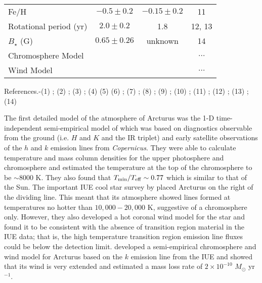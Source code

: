 \begin{table}[!hb]
\begin{center}
\begin{tabular}{lccc}
Fe/H& $-0.5\pm0.2$ & $- 0.15 \pm 0.2$ & 11\\
Rotational period (yr) & $2.0 \pm 0.2$ & 1.8 & 12, 13\\
$B_{\star}$ (G) & $0.65 \pm 0.26$ & unknown & 14\\
Chromosphere Model & \cite{drake_1985} & \cite{mcmurry_1999}& $\ldots$\\
Wind Model & \cite{drake_1985}& \cite{robinson_1998}& $\ldots$\\
\hline
\end{tabular}
\label{tab:3.4}
\begin{minipage}{14.0cm}
References.-(1) \cite{perryman_1997}; (2) \cite{van_leeuwen_2007}; (3) \cite{kallinger_2010}; (4) \cite{lebzelter_2012}  (5) \cite{ramirez_2011} (6) \cite{richichi_2005}; (7) \cite{di_benedetto_1993}; (8) \cite{massarotti_2008}; (9) \cite{drake_1985}; (10) \cite{robinson_1998};  (11) \cite{decin_2003}; (12) \cite{gray_2006}; (13) \cite{hatzes_1993}; (14) \cite{sennhauser_2011}
\end{minipage}
\end{center}
\end{table}

The first detailed model of the atmosphere of Arcturus was the 1-D time-independent semi-empirical model of \cite{ayres_1975} which was based on diagnostics observable from the ground (i.e.  $H$ and $K$ and the  IR triplet) and early satellite observations of the  $h$ and $k$ emission lines from \textit{Copernicus}. They were able to calculate temperature and mass column densities for the upper photosphere and chromosphere and estimated the temperature at the top of the chromosphere to be $\sim 8000$ K. They also found that $T_{\rm{min}}/T_{\rm{eff}} \sim 0.77$ which is similar to that of the Sun. The important IUE cool star survey by \cite{linsky_1979} placed Arcturus on the right of the dividing line. This meant that its atmosphere showed lines formed at temperatures no hotter than $10,000 - 20,000$ K, suggestive of a chromosphere only. However, they also developed a hot coronal wind model for the star and found it to be consistent with the absence of transition region material in the IUE data; 	that is, the high temperature transition region emission line fluxes could be below the detection limit. \cite{drake_1985} developed a semi-empirical chromosphere and wind model for Arcturus based on the  $k$ emission line from the IUE and showed that its wind is very extended and estimated a mass loss rate of $2\times 10^{-10}$ $M_{\odot}$ yr$^{-1}$.

